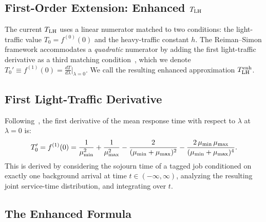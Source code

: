\subsection{First-Order Extension: Enhanced $T_{\text{LH}}$}
\label{sec:approx-lhe}

The current $T_{\text{LH}}$ uses a linear numerator matched to two conditions:
the light-traffic value $T_0 = f^{(0)}(0)$ and the heavy-traffic constant $h$.
The Reiman--Simon framework accommodates a \emph{quadratic} numerator by
adding the first light-traffic derivative as a third matching
condition~\citep{Squillante2026}, which we denote
$T_0' \equiv f^{(1)}(0) = \frac{dT}{d\lambda}\big|_{\lambda=0}$.
We call the resulting enhanced approximation $T_{\text{LH}}^{\text{enh}}$.

\subsection{First Light-Traffic Derivative}
\label{sec:f1}

Following~\citep{Squillante2026}, the first derivative of the mean response
time with respect to $\lambda$ at $\lambda = 0$ is:
\begin{equation}
  \label{eq:f1}
  T_0' = f^{(1)}(0) = \frac{1}{\mu_{\min}^2} + \frac{1}{\mu_{\max}^2}
             - \frac{2}{(\mu_{\min}+\mu_{\max})^2}
             - \frac{2\,\mu_{\min}\,\mu_{\max}}{(\mu_{\min}+\mu_{\max})^4}.
\end{equation}
This is derived by considering the sojourn time of a tagged job conditioned
on exactly one background arrival at time $t \in (-\infty, \infty)$,
analyzing the resulting joint service-time distribution, and integrating
over $t$.

\subsection{The Enhanced Formula}
\label{sec:tlhe}

